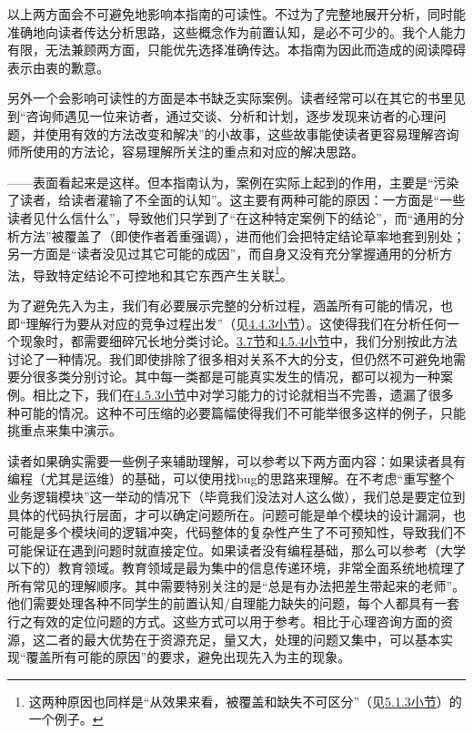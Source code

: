 以上两方面会不可避免地影响本指南的可读性。不过为了完整地展开分析，同时能准确地向读者传达分析思路，这些概念作为前置认知，是必不可少的。我个人能力有限，无法兼顾两方面，只能优先选择准确传达。本指南为因此而造成的阅读障碍表示由衷的歉意。

另外一个会影响可读性的方面是本书缺乏实际案例。读者经常可以在其它的书里见到“咨询师遇见一位来访者，通过交谈、分析和计划，逐步发现来访者的心理问题，并使用有效的方法改变和解决”的小故事，这些故事能使读者更容易理解咨询师所使用的方法论，容易理解所关注的重点和对应的解决思路。

——表面看起来是这样。但本指南认为，案例在实际上起到的作用，主要是“污染了读者，给读者灌输了不全面的认知”。这主要有两种可能的原因：一方面是“一些读者见什么信什么”，导致他们只学到了“在这种特定案例下的结论”，而“通用的分析方法”被覆盖了（即使作者着重强调），进而他们会把特定结论草率地套到别处；另一方面是“读者没见过其它可能的成因”，而自身又没有充分掌握通用的分析方法，导致特定结论不可控地和其它东西产生关联\footnote{这两种原因也同样是“从效果来看，被覆盖和缺失不可区分”（见\hyperref[para:被覆盖与缺失]{5.1.3小节}）的一个例子。}。

为了避免先入为主，我们有必要展示完整的分析过程，涵盖所有可能的情况，也即“理解行为要从对应的竞争过程出发”（见\hyperref[sec:对竞争过程的解读]{4.4.3小节}）。这使得我们在分析任何一个现象时，都需要细碎冗长地分类讨论。\hyperref[sec:情绪、感受与其分析与处理方法]{3.7节}和\hyperref[sec:指挥现象的一个实例解读]{4.5.4小节}中，我们分别按此方法讨论了一种情况。我们即使排除了很多相对关系不大的分支，但仍然不可避免地需要分很多类分别讨论。其中每一类都是可能真实发生的情况，都可以视为一种案例。相比之下，我们在\hyperref[sec:交流和讲解时的指挥需求]{4.5.3小节}中对学习能力的讨论就相当不完善，遗漏了很多种可能的情况。这种不可压缩的必要篇幅使得我们不可能举很多这样的例子，只能挑重点来集中演示。

读者如果确实需要一些例子来辅助理解，可以参考以下两方面内容：如果读者具有编程（尤其是运维）的基础，可以使用找bug的思路来理解。在不考虑“重写整个业务逻辑模块”这一举动的情况下（毕竟我们没法对人这么做），我们总是要定位到具体的代码执行层面，才可以确定问题所在。问题可能是单个模块的设计漏洞，也可能是多个模块间的逻辑冲突，代码整体的复杂性产生了不可预知性，导致我们不可能保证在遇到问题时就直接定位。如果读者没有编程基础，那么可以参考（大学以下的）教育领域。教育领域是最为集中的信息传递环境，非常全面系统地梳理了所有常见的理解顺序。其中需要特别关注的是“总是有办法把差生带起来的老师”。他们需要处理各种不同学生的前置认知/自理能力缺失的问题，每个人都具有一套行之有效的定位问题的方式。这些方式可以用于参考。相比于心理咨询方面的资源，这二者的最大优势在于资源充足，量又大，处理的问题又集中，可以基本实现“覆盖所有可能的原因”的要求，避免出现先入为主的现象。


